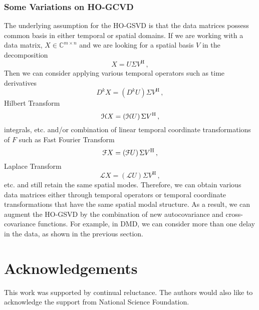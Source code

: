 \documentclass[10pt]{article}
\begin{document}
\subsubsection{Some Variations on HO-GCVD}

The underlying assumption for the HO-GSVD is that the data matrices possess common basis in either temporal or spatial domains.
If we are working with a data matrix, $X\in\mathbb{C}^{m\times n}$ and we are looking for a spatial basis $V$ in the decomposition
\begin{equation}
    X = U\Sigma V^\mathrm{H}\,,
\end{equation}
Then we can consider applying various temporal operators such as time derivatives
\begin{equation}
    D^k X = \left(D^k U\right) \Sigma V^\mathrm{H}\,,
\end{equation} 
Hilbert Transform\begin{equation}
    {\cal H} X = \left({\cal H} U\right) \Sigma V^\mathrm{H}\,,
\end{equation}
integrals, etc. and/or combination of linear temporal coordinate transformations of $F$ such as Fast Fourier Transform 
\begin{equation}
    {\cal F} X = \left({\cal F} U\right) \Sigma V^\mathrm{H}\,,
\end{equation}
Laplace Transform
\begin{equation}
    \mathcal{L} X = \left(\mathcal{L} U\right) \Sigma V^\mathrm{H}\,,
\end{equation}
etc. and still retain the same spatial modes. 
Therefore, we can obtain various data matrices either through temporal operators or temporal coordinate transformations that have the same spatial modal structure.
As a result, we can augment the HO-GSVD by the combination of new autocovariance and cross-covariance functions.
For example, in DMD, we can consider more than one delay in the data, as shown in the previous section.
\section*{Acknowledgements}
This work was supported by continual reluctance. The authors would also like to acknowledge the support from National Science Foundation.

%


\end{document}
